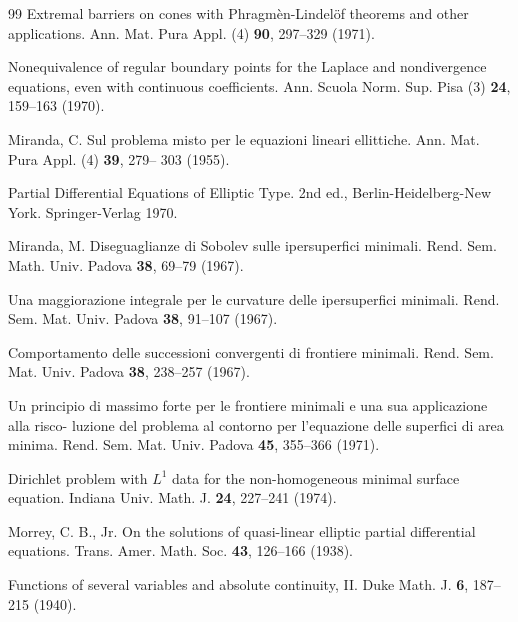 \begin{thebibliography}{99}
Extremal barriers on cones with Phragm\`en-Lindel\"of theorems and other applications.
Ann. Mat. Pura Appl. (4) \textbf{90}, 297--329 (1971).

Nonequivalence of regular boundary points for the Laplace and nondivergence equations,
even with continuous coefficients. Ann. Scuola Norm. Sup. Pisa (3) \textbf{24}, 159--163 (1970).

Miranda, C.
Sul problema misto per le equazioni lineari ellittiche. Ann. Mat. Pura Appl. (4) \textbf{39}, 279--
303 (1955).

Partial Differential Equations of Elliptic Type. 2nd ed., Berlin-Heidelberg-New York.
Springer-Verlag 1970.

Miranda, M.
Diseguaglianze di Sobolev sulle ipersuperfici minimali. Rend. Sem. Math. Univ. Padova
\textbf{38}, 69--79 (1967).

Una maggiorazione integrale per le curvature delle ipersuperfici minimali. Rend. Sem.
Mat. Univ. Padova \textbf{38}, 91--107 (1967).

Comportamento delle successioni convergenti di frontiere minimali. Rend. Sem. Mat.
Univ. Padova \textbf{38}, 238--257 (1967).

Un principio di massimo forte per le frontiere minimali e una sua applicazione alla risco-
luzione del problema al contorno per l'equazione delle superfici di area minima. Rend.
Sem. Mat. Univ. Padova \textbf{45}, 355--366 (1971).

Dirichlet problem with $L^1$ data for the non-homogeneous minimal surface equation.
Indiana Univ. Math. J. \textbf{24}, 227--241 (1974).

Morrey, C. B., Jr.
On the solutions of quasi-linear elliptic partial differential equations. Trans. Amer. Math.
Soc. \textbf{43}, 126--166 (1938).

Functions of several variables and absolute continuity, II. Duke Math. J. \textbf{6}, 187--215
(1940).

\end{thebibliography}


